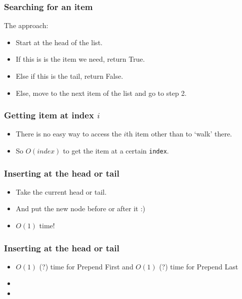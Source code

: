 \begin{frame}
	\frametitle{Searching for an item}	
	The approach:
	\begin{itemize}
		\item Start at the head of the list.
		\item If this is is the item we need, return True.
		\item Else if this is the tail, return False.
		\item Else, move to the next item of the list and go to step 2.
	\end{itemize}

	

	

\end{frame}

\begin{frame}
	\frametitle{Getting item at index $i$}

	\begin{itemize}
		\item There is no easy way to access the $i$th item other than to `walk' there.
		\item So $O(\textit{index})$ to get the item at a certain \texttt{index}.
	\end{itemize}
	
\end{frame}

\begin{frame}
	\frametitle{Inserting at the head or tail}
	\begin{itemize}
		\item Take the current head or tail.
		\item And put the new node before or after it :)
		\item \alert{$O(1)$ time!}
	\end{itemize}	


\end{frame}

\begin{frame}
	\frametitle{Inserting at the head or tail}

		\begin{itemize}
			\item $O(1)$ (?) time for Prepend First and $O(1)$ (?) time for Prepend Last

		\item 
		
				
		\item 
	\end{itemize}	

\end{frame}


